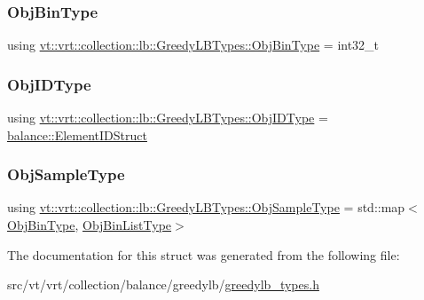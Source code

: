 \subsubsection{\texorpdfstring{Obj\+Bin\+Type}{ObjBinType}}
{\footnotesize\ttfamily using \hyperlink{structvt_1_1vrt_1_1collection_1_1lb_1_1_greedy_l_b_types_ae0dc433e9afe6112dd0a7ba402e0d6c2}{vt\+::vrt\+::collection\+::lb\+::\+Greedy\+L\+B\+Types\+::\+Obj\+Bin\+Type} =  int32\+\_\+t}

\mbox{\label{structvt_1_1vrt_1_1collection_1_1lb_1_1_greedy_l_b_types_ae22670acd689e4ff83315fac2e4acb5e}} 
\subsubsection{\texorpdfstring{Obj\+I\+D\+Type}{ObjIDType}}
{\footnotesize\ttfamily using \hyperlink{structvt_1_1vrt_1_1collection_1_1lb_1_1_greedy_l_b_types_ae22670acd689e4ff83315fac2e4acb5e}{vt\+::vrt\+::collection\+::lb\+::\+Greedy\+L\+B\+Types\+::\+Obj\+I\+D\+Type} =  \hyperlink{namespacevt_1_1vrt_1_1collection_1_1balance_a9f5b53fafb270212279a4757d2c4cd28}{balance\+::\+Element\+I\+D\+Struct}}

\mbox{\label{structvt_1_1vrt_1_1collection_1_1lb_1_1_greedy_l_b_types_a467f8a79d0785fca5fc95bd5c0f406b9}} 
\subsubsection{\texorpdfstring{Obj\+Sample\+Type}{ObjSampleType}}
{\footnotesize\ttfamily using \hyperlink{structvt_1_1vrt_1_1collection_1_1lb_1_1_greedy_l_b_types_a467f8a79d0785fca5fc95bd5c0f406b9}{vt\+::vrt\+::collection\+::lb\+::\+Greedy\+L\+B\+Types\+::\+Obj\+Sample\+Type} =  std\+::map$<$\hyperlink{structvt_1_1vrt_1_1collection_1_1lb_1_1_greedy_l_b_types_ae0dc433e9afe6112dd0a7ba402e0d6c2}{Obj\+Bin\+Type}, \hyperlink{structvt_1_1vrt_1_1collection_1_1lb_1_1_greedy_l_b_types_a5f1f5da7ec80da0de64a9d91624c396b}{Obj\+Bin\+List\+Type}$>$}



The documentation for this struct was generated from the following file\+:\begin{DoxyCompactItemize}
\item 
src/vt/vrt/collection/balance/greedylb/\hyperlink{greedylb__types_8h}{greedylb\+\_\+types.\+h}\end{DoxyCompactItemize}
